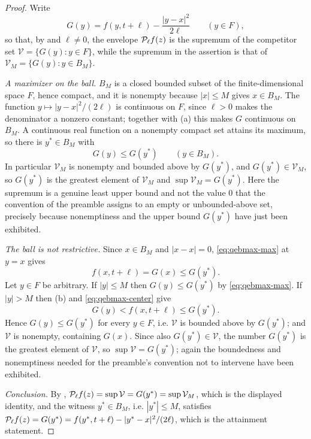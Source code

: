 \begin{proof}
Write
\[
  G(y)=f(y,t+\ell)-\frac{|y-x|^2}{2\ell}\qquad(y\in F),
\]
so that, by  and $\ell\ne0$, the envelope $\mathcal{P}_\ell f(z)$ is
the supremum of the competitor set $\mathcal V=\{G(y):y\in F\}$, while the
supremum in the assertion is that of $\mathcal V_M=\{G(y):y\in B_M\}$.

\emph{A maximizer on the ball.}
$B_M$ is a closed bounded subset of the finite-dimensional space $F$, hence
compact, and it is nonempty because $|x|\le M$ gives $x\in B_M$. The function
$y\mapsto|y-x|^2/(2\ell)$ is continuous on $F$, since $\ell>0$ makes the
denominator a nonzero constant; together with (a) this makes $G$ continuous on
$B_M$. A continuous real function on a nonempty compact set attains its maximum,
so there is $y^\ast\in B_M$ with
\begin{equation}\label{eq:qebmax-max}
  G(y)\le G(y^\ast)\qquad(y\in B_M).
\end{equation}
In particular $\mathcal V_M$ is nonempty and bounded above by $G(y^\ast)$, and
$G(y^\ast)\in\mathcal V_M$, so $G(y^\ast)$ is the greatest element of
$\mathcal V_M$ and $\sup\mathcal V_M=G(y^\ast)$. Here the supremum is a genuine
least upper bound and not the value $0$ that the convention of the preamble
assigns to an empty or unbounded-above set, precisely because nonemptiness and
the upper bound $G(y^\ast)$ have just been exhibited.

\emph{The ball is not restrictive.}
Since $x\in B_M$ and $|x-x|=0$, \eqref{eq:qebmax-max} at $y=x$ gives
\begin{equation}\label{eq:qebmax-center}
  f(x,t+\ell)=G(x)\le G(y^\ast).
\end{equation}
Let $y\in F$ be arbitrary. If $|y|\le M$ then $G(y)\le G(y^\ast)$ by
\eqref{eq:qebmax-max}. If $|y|>M$ then (b) and \eqref{eq:qebmax-center} give
\[
  G(y)<f(x,t+\ell)\le G(y^\ast).
\]
Hence $G(y)\le G(y^\ast)$ for every $y\in F$, i.e. $\mathcal V$ is bounded above
by $G(y^\ast)$; and $\mathcal V$ is nonempty, containing $G(x)$. Since also
$G(y^\ast)\in\mathcal V$, the number $G(y^\ast)$ is the greatest element of
$\mathcal V$, so $\sup\mathcal V=G(y^\ast)$; again the boundedness and
nonemptiness needed for the preamble's convention not to intervene have been
exhibited.

\emph{Conclusion.}
By , $\mathcal{P}_\ell f(z)=\sup\mathcal V=G(y^\ast)
=\sup\mathcal V_M$, which is the displayed identity, and the witness
$y^\ast\in B_M$, i.e. $|y^\ast|\le M$, satisfies
$\mathcal{P}_\ell f(z)=G(y^\ast)=f(y^\ast,t+\ell)-|y^\ast-x|^2/(2\ell)$, which is the
attainment statement.
\end{proof}
